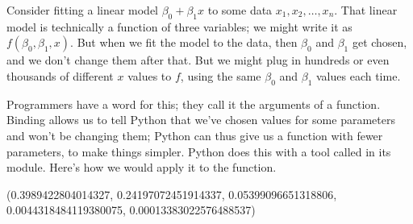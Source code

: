 \documentclass[letterpaper,10pt,english]{jupyterBook}
\begin{document}
\sphinxAtStartPar
{}  Consider fitting a linear model \(\beta_0+\beta_1x\) to some data \(x_1,x_2,\ldots,x_n\).  That linear model is technically a function of three variables; we might write it as \(f(\beta_0,\beta_1,x)\).  But when we fit the model to the data, then \(\beta_0\) and \(\beta_1\) get chosen, and we don’t change them after that.  But we might plug in hundreds or even thousands of different \(x\) values to \(f\), using the same \(\beta_0\) and \(\beta_1\) values each time.

\sphinxAtStartPar
Programmers have a word for this; they call it  the arguments of a function.  Binding allows us to tell Python that we’ve chosen values for some parameters and won’t be changing them; Python can thus give us a function with fewer parameters, to make things simpler.  Python does this with a tool called  in its  module.  Here’s how we would apply it to the  function.

\begin{sphinxVerbatim}[commandchars=\\\{\}]
   

      

              
\end{sphinxVerbatim}

\begin{sphinxVerbatim}[commandchars=\\\{\}]
(0.3989422804014327,
 0.24197072451914337,
 0.05399096651318806,
 0.0044318484119380075,
 0.00013383022576488537)
\end{sphinxVerbatim}
\end{document}
